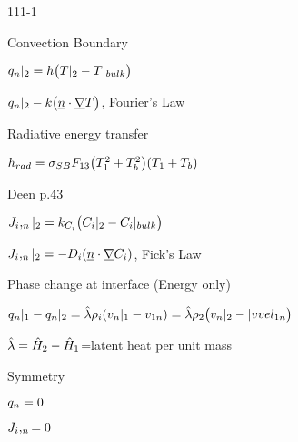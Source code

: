 \begin{mitframe}{111-1}
\begin{listone}
\begin{listtwo}
            \end{listtwo}
\item Convection  Boundary
		\begin{listtwo}
        	\item $\heatflux_n|_2=\heattranscoeff\big(\Temp|_2-\Temp|_{bulk}\big)$
            	\begin{listthree}
                	\item $\heatflux_n|_2-\thermcond\big(\uline{n}\cdot\gradop\Temp\big)$, Fourier's Law
                    \item Radiative energy transfer
                    	\begin{listfour}
                        	\item $\heattranscoeff_{rad}=\molecrad_{\entropy\exergy}\force_{13}\big(\Temp_1^2+\Temp_b^2\big)(\Temp_1+\Temp_b)$
                            \item Deen p.43
                        \end{listfour}
                \end{listthree}
        	\item $\molspecflux,_n|_2=\thermcond_{\conc_{\state}}\big(\conc_{\state}|_2-\conc_{\state}|_{bulk}\big)$
            	\begin{listthree}
                	\item $\molspecflux,_n|_2=-\pdiff(\uline{n}\cdot\gradop\conc_{\state})$, Fick's Law
                \end{listthree} 
        \end{listtwo}
	\item Phase change at interface (Energy only)
    	\begin{listtwo}
        	\item $\heatflux_n|_1-\heatflux_n|_2=\hat{\wavel}\dens_{\state}(\vvel_n|_1-\vvel_{1n})=\hat{\wavel}\dens_2\big(\vvel_n|_2-|vvel_{1n}\big)$
            	\begin{listthree}
                	\item $\hat{\wavel}=\hat{\enthalpy}_2-\hat{\enthalpy}_1$=latent heat per unit mass
                \end{listthree}
        \end{listtwo}
	\item Symmetry
    		\begin{listtwo}
            	\item $\heatflux_n=0$
                \item $\molspecflux,_n=0$
            \end{listtwo}
\end{listone}  	     
\end{mitframe}